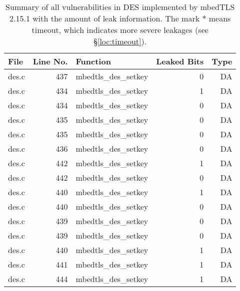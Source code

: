 \begin{table}%
\centering\tiny\scriptsize
\caption{Summary of all vulnerabilities in DES implemented by mbedTLS 2.15.1 with the amount of leak information. The mark $*$ means timeout, which indicates more severe leakages (see \S\ref{loc:timeout}).}\label{tab:DESmbedTLS}
\begin{tabular}{lrlrr}
\hline
\textbf{File} & \textbf{Line No.} & \textbf{Function} & \textbf{Leaked Bits} & \textbf{Type} \\\hline
des.c& 437&mbedtls\_des\_setkey&0 &DA\\
des.c& 434&mbedtls\_des\_setkey&1 &DA\\
des.c& 434&mbedtls\_des\_setkey&0 &DA\\
des.c& 435&mbedtls\_des\_setkey&0 &DA\\
des.c& 435&mbedtls\_des\_setkey&0 &DA\\
des.c& 436&mbedtls\_des\_setkey&0 &DA\\
des.c& 442&mbedtls\_des\_setkey&1 &DA\\
des.c& 442&mbedtls\_des\_setkey&0 &DA\\
des.c& 440&mbedtls\_des\_setkey&1 &DA\\
des.c& 440&mbedtls\_des\_setkey&0 &DA\\
des.c& 439&mbedtls\_des\_setkey&0 &DA\\
des.c& 439&mbedtls\_des\_setkey&0 &DA\\
des.c& 440&mbedtls\_des\_setkey&1 &DA\\
des.c& 441&mbedtls\_des\_setkey&1 &DA\\
des.c& 444&mbedtls\_des\_setkey&1 &DA\\
\hline
\end{tabular}
\end{table}